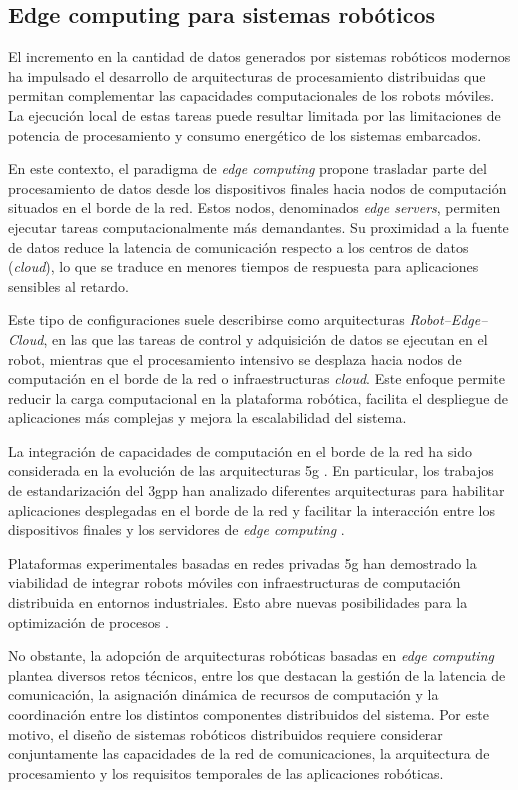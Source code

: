 \subsection{Edge computing para sistemas robóticos}
\label{sec:edge_computing_para_sistemas_roboticos}

El incremento en la cantidad de datos generados por sistemas robóticos modernos ha impulsado el desarrollo de arquitecturas de procesamiento distribuidas que permitan complementar las capacidades computacionales de los robots móviles. La ejecución local de estas tareas puede resultar limitada por las limitaciones de potencia de procesamiento y consumo energético de los sistemas embarcados.

En este contexto, el paradigma de \textit{edge computing} propone trasladar parte del procesamiento de datos desde los dispositivos finales hacia nodos de computación situados en el borde de la red. Estos nodos, denominados \textit{edge servers}, permiten ejecutar tareas computacionalmente más demandantes. Su proximidad a la fuente de datos reduce la latencia de comunicación respecto a los centros de datos (\textit{cloud}), lo que se traduce en menores tiempos de respuesta para aplicaciones sensibles al retardo.

Este tipo de configuraciones suele describirse como arquitecturas \textit{Robot--Edge--Cloud}, en las que las tareas de control y adquisición de datos se ejecutan en el robot, mientras que el procesamiento intensivo se desplaza hacia nodos de computación en el borde de la red o infraestructuras \textit{cloud}. Este enfoque permite reducir la carga computacional en la plataforma robótica, facilita el despliegue de aplicaciones más complejas y mejora la escalabilidad del sistema.

La integración de capacidades de computación en el borde de la red ha sido considerada en la evolución de las arquitecturas \gls{5g} . En particular, los trabajos de estandarización del \gls{3gpp} han analizado diferentes arquitecturas para habilitar aplicaciones desplegadas en el borde de la red y facilitar la interacción entre los dispositivos finales y los servidores de \textit{edge computing} \cite{3gppTR23758}. 

Plataformas experimentales basadas en redes privadas \gls{5g} han demostrado la viabilidad de integrar robots móviles con infraestructuras de computación distribuida en entornos industriales. Esto abre nuevas posibilidades para la optimización de procesos \cite{10885713}.

No obstante, la adopción de arquitecturas robóticas basadas en \textit{edge computing} plantea diversos retos técnicos, entre los que destacan la gestión de la latencia de comunicación, la asignación dinámica de recursos de computación y la coordinación entre los distintos componentes distribuidos del sistema. Por este motivo, el diseño de sistemas robóticos distribuidos requiere considerar conjuntamente las capacidades de la red de comunicaciones, la arquitectura de procesamiento y los requisitos temporales de las aplicaciones robóticas.